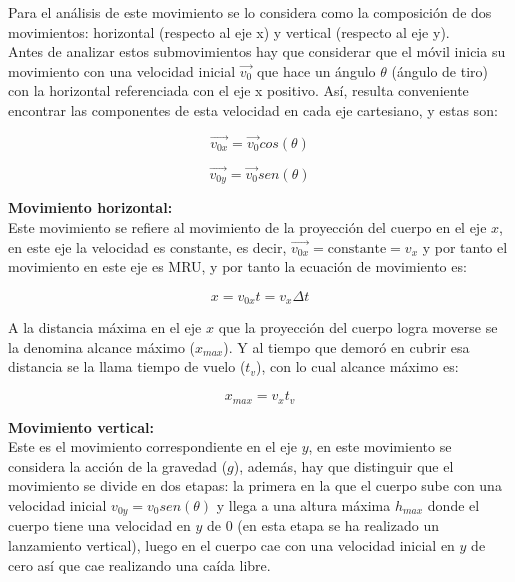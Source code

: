 \documentclass[a5paper,pagesize,10pt,bibtotoc,pointlessnumbers,
normalheadings,DIV=9,fleqn,x11names,table,twoside=false]{scrbook}
\begin{document}
Para el análisis de este movimiento se lo considera como la composición de dos movimientos: horizontal (respecto al eje x) y 
vertical (respecto al eje y).\\

Antes de analizar estos submovimientos hay que considerar que el móvil inicia su movimiento con una velocidad inicial $\vec{v_0}$ 
que hace un ángulo $\theta$ (ángulo de tiro) con la horizontal referenciada con el eje x positivo. Así, resulta conveniente 
encontrar las componentes de esta velocidad en cada eje cartesiano, y estas son:

\begin{equation}
 \vec{v_{0x}}=\vec{v_0}cos(\theta)
\end{equation}

\begin{equation}
 \vec{v_{0y}}=\vec{v_0}sen(\theta)
\end{equation}

\textbf{Movimiento horizontal:}\\

Este movimiento se refiere al movimiento de la proyección del cuerpo en el eje $x$, en este eje la velocidad es constante, es 
decir, $\vec{v_{0x}} =  \text{constante} = v_x$ y por tanto el movimiento en este eje es MRU, y por tanto la ecuación de 
movimiento es:

\begin{equation}
 x = v_{0x}t=v_x \Delta t
\end{equation}

A la distancia máxima en el eje $x$ que la proyección del cuerpo logra moverse se la denomina alcance máximo ($x_{max}$). Y al 
tiempo que demoró en cubrir esa distancia se la llama tiempo de vuelo ($t_v$), con lo cual alcance máximo es:

\begin{equation}
 x_{max} =  v_x t_v
\end{equation}

\textbf{Movimiento vertical:}\\

Este es el movimiento correspondiente en el eje $y$, en este movimiento se considera la acción de la gravedad ($g$), además, hay 
que distinguir que el movimiento se divide en dos etapas: la primera en la que el cuerpo sube con una velocidad inicial $v_{0y} = 
 v_0 sen(\theta)$ y llega a una altura máxima $h_{max}$ donde el cuerpo tiene una velocidad en $y$ de 0 (en esta etapa se ha 
realizado un lanzamiento vertical), luego en el cuerpo cae con una velocidad inicial en $y$ de cero así que cae realizando una 
caída libre.\\
\end{document}
